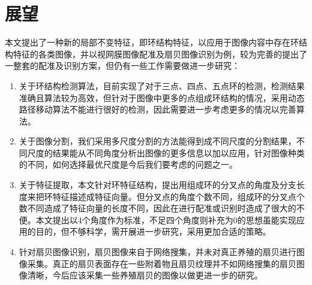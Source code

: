 \section{展望}
\label{}
本文提出了一种新的局部不变特征，即环结构特征，以应用于图像内容中存在环结构特征的各类图像，并以视网膜图像配准及扇贝图像识别为例，较为完善的提出了一整套的配准及识别方案，但仍有一些工作需要做进一步研究：
\begin{enumerate}
\item 关于环结构检测算法，目前实现了对于三点、四点、五点环的检测，检测结果准确且算法较为高效，但针对于图像中更多的点组成环结构的情况，采用动态路径移动算法不能进行很好的检测，因此需要进一步考虑更多的情况以完善算法。
\item 关于图像分割，我们采用多尺度分割的方法能得到成不同尺度的分割结果，不同尺度的结果能从不同角度分析出图像的更多信息以加以应用，针对图像种类的不同，如何选择最优尺度是今后我们要考虑的问题之一。
\item 关于特征提取，本文针对环特征结构，提出用组成环的分叉点的角度及分支长度来把环特征描述成特征向量。但分叉点的角度个数不同，组成环的分叉点个数不同造成了特征向量的长度不同，因此在进行配准或识别时造成了很大的不便。本文提出以4个角度作为标准，不足四个角度则补充为0的思想虽能实现应用的目的，但不够科学，需开展进一步研究，采用更加合适的策略。
\item 针对扇贝图像识别，扇贝图像来自于网络搜集，并未对真正养殖的扇贝进行图像采集。真正的扇贝表面存在一些附着物且扇贝纹理并不如网络搜集的扇贝图像清晰，今后应该采集一些养殖扇贝的图像以做更进一步的研究。
\end{enumerate}
